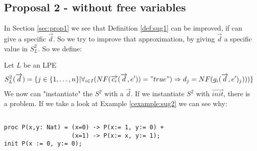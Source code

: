 \index{}\documentclass[a4paper,10pt]{article}
\theoremstyle{plain}
\theoremstyle{definition}
\newcommand{\ovr}{\overrightarrow}
\begin{document}
\subsection{Proposal 2 - without free variables}
In Section \ref{sec:prop1} we see that Definition \ref{def:sug1} can be improved, if can give a specific $\ovr{d}$. So we try to improve that approximation, by giving $\ovr{d}$ a specific value in $S_L^2$. So we define: 

\begin{defn} Let $L$ be an LPE\label{def:sug2} 
\begin{displaymath}
S_L^2(\ovr{d})=
\lbrace   
j \in \lbrace 1, \ldots , n \rbrace \vert \forall_{i\in I} (NF(\ovr{c_i}(\ovr{d},e')) = "true") \Rightarrow d_j = NF(g_i(\ovr{d},e')_j)))\rbrace
\end{displaymath}
We now can "instantiate" the $S^2$ with a $\ovr{d}$. If we instantiate $S^2$ with $\ovr{init}$, there is a problem. If we take a look at Example \ref{cexample:sug2} we can see why:
\begin{example} [Let $E2$ be]\label{cexample:sug2}\begin{verbatim} 
 
proc P(x,y: Nat) = (x=0) -> P(x:= 1, y:= 0) +
                   (x=1) -> P(x:= x, y:= 1);
init P(x := 0, y:= 0);


\end{verbatim}
\end{example}
\end{defn}
\end{document}
